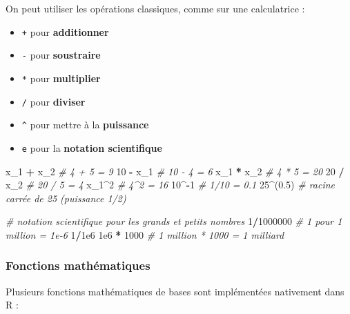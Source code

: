 \documentclass[
]{book}
\newenvironment{Shaded}{\begin{snugshade}}{\end{snugshade}}
\newcommand{\CommentTok}[1]{\textcolor[rgb]{0.56,0.35,0.01}{\textit{#1}}}
\newcommand{\DecValTok}[1]{\textcolor[rgb]{0.00,0.00,0.81}{#1}}
\newcommand{\FloatTok}[1]{\textcolor[rgb]{0.00,0.00,0.81}{#1}}
\newcommand{\NormalTok}[1]{#1}
\newcommand{\SpecialCharTok}[1]{\textcolor[rgb]{0.81,0.36,0.00}{\textbf{#1}}}
\providecommand{\tightlist}{%
  \setlength{\itemsep}{0pt}\setlength{\parskip}{0pt}}
\begin{document}
On peut utiliser les opérations classiques, comme sur une calculatrice :

\begin{itemize}
\tightlist
\item
  \texttt{+} pour \textbf{additionner}
\item
  \texttt{-} pour \textbf{soustraire}
\item
  \texttt{*} pour \textbf{multiplier}
\item
  \texttt{/} pour \textbf{diviser}
\item
  \texttt{\^{}} pour mettre à la \textbf{puissance}
\item
  \texttt{e} pour la \textbf{notation scientifique}
\end{itemize}

\begin{Shaded}
\begin{Highlighting}[]
\NormalTok{x\_1 }\SpecialCharTok{+}\NormalTok{ x\_2 }\CommentTok{\# 4 + 5 = 9}
\DecValTok{10} \SpecialCharTok{{-}}\NormalTok{ x\_1 }\CommentTok{\# 10 {-} 4 = 6}
\NormalTok{x\_1 }\SpecialCharTok{*}\NormalTok{ x\_2 }\CommentTok{\#  4 * 5 = 20}
\DecValTok{20} \SpecialCharTok{/}\NormalTok{ x\_2 }\CommentTok{\# 20 / 5 = 4}
\NormalTok{x\_1}\SpecialCharTok{\^{}}\DecValTok{2} \CommentTok{\#  4\^{}2 = 16}
\DecValTok{10}\SpecialCharTok{\^{}{-}}\DecValTok{1} \CommentTok{\# 1/10 = 0.1}
\DecValTok{25}\SpecialCharTok{\^{}}\NormalTok{(}\FloatTok{0.5}\NormalTok{) }\CommentTok{\# racine carrée de 25 (puissance 1/2)}

\CommentTok{\# notation scientifique pour les grands et petits nombres}
\DecValTok{1}\SpecialCharTok{/}\DecValTok{1000000} \CommentTok{\# 1 pour 1 million = 1e{-}6}
\DecValTok{1}\SpecialCharTok{/}\FloatTok{1e6}
\FloatTok{1e6} \SpecialCharTok{*} \DecValTok{1000} \CommentTok{\# 1 million * 1000 = 1 milliard}
\end{Highlighting}
\end{Shaded}

\subsubsection{Fonctions mathématiques}\label{fonctions-mathuxe9matiques}

Plusieurs fonctions mathématiques de bases sont implémentées nativement dans R :
\end{document}
